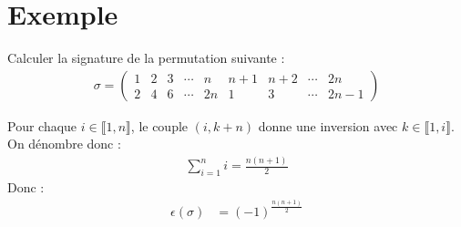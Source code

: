 \documentclass[../main.tex]{subfiles}
\begin{document}
\section{Exemple}
\begin{tcolorbox}[title=Exemple 29.69, title filled=false, colframe=darkgreen, colback=darkgreen!10!white]
    Calculer la signature de la permutation suivante : 
    \begin{align*}
        \sigma = \begin{pmatrix}
            1 & 2 & 3 & \cdots & n & n+1 & n+2 & \cdots & 2n \\
            2 & 4 & 6 & \cdots & 2n & 1 & 3 & \cdots & 2n-1
        \end{pmatrix}
    \end{align*}
\end{tcolorbox}

\noindent Pour chaque $i\in \llbracket 1, n \rrbracket$, le couple $(i, k+n)$ donne une inversion avec $k\in \llbracket 1, i \rrbracket$. \\
On dénombre donc : 
\begin{align*}
    \sum_{i=1}^{n} i = \frac{n(n+1)}{2}
\end{align*}
Donc : 
\begin{align*}
    \epsilon(\sigma) &= (-1)^{\frac{n(n+1)}{2}} \\
\end{align*}
\end{document}
